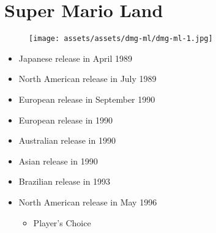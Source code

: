 \documentclass{book}
\begin{document}
\begingroup \chapter*{Super Mario Land} \endgroup
\begin{figure}[H]
\vskip 4pt
\centering
\texttt{[image: assets/assets/dmg-ml/dmg-ml-1.jpg]}\end{figure}
\begin{itemize} [nosep]




\item Japanese release in April 1989







\item North American release in July 1989







\item European release in September 1990







\item European release in 1990







\item Australian release in 1990







\item Asian release in 1990







\item Brazilian release in 1993







\item North American release in May 1996
\begin{itemize} [nosep]\item Player’s Choice\end{itemize}\noindent







\end{itemize}
\end{document}

